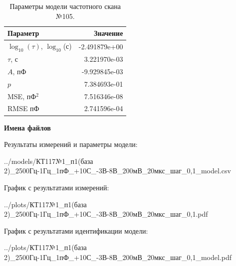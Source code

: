\begin{table}[!ht]
    \centering
    \caption{Параметры модели частотного скана №105.}
    \begin{tabular}{|l|r|}
        \hline
        Параметр                                       & Значение                  \\ \hline
        $\log_{10}(\tau)$, $\log_{10}$(с)              & -2.491879e+00             \\ \hline
        $\tau$, с                                      & 3.221970e-03              \\ \hline
        $A$, пФ                                        & -9.929845e-03             \\ \hline
        $p$                                            & 7.384693e-01              \\ \hline
        MSE, пФ$^2$                                    & 7.516346e-08              \\ \hline
        RMSE пФ                                        & 2.741596e-04              \\ \hline
    \end{tabular}
    \label{table:frequency_scan_model_105}
\end{table}

\textbf{Имена файлов}

Результаты измерений и параметры модели:

\scriptsize../models/КТ117№1\_п1(база 2)\_2500Гц-1Гц\_1пФ\_+10С\_-3В-8В\_200мВ\_20мкс\_шаг\_0,1\_model.csv
\normalsize

График с результатами измерений:

\scriptsize../plots/КТ117№1\_п1(база 2)\_2500Гц-1Гц\_1пФ\_+10С\_-3В-8В\_200мВ\_20мкс\_шаг\_0,1.pdf
\normalsize

График с результатами идентификации модели:

\scriptsize../plots/КТ117№1\_п1(база 2)\_2500Гц-1Гц\_1пФ\_+10С\_-3В-8В\_200мВ\_20мкс\_шаг\_0,1\_model.pdf
\normalsize

